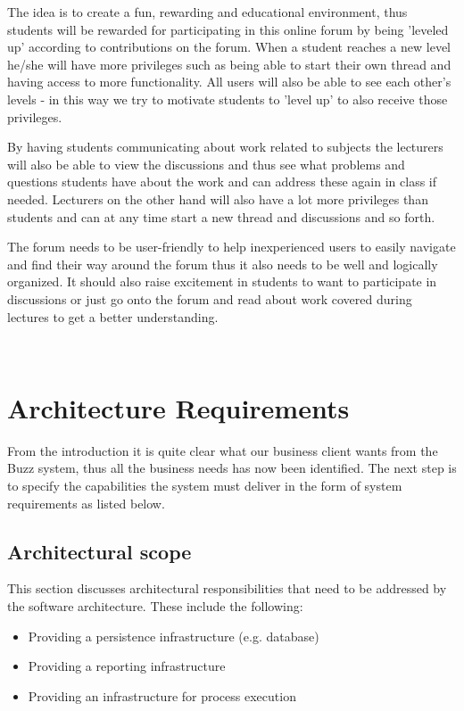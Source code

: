 \documentclass[a4paper]{article}
\begin{document}
The idea is to create a fun, rewarding and educational environment, thus students will be rewarded for participating in this online forum by being 'leveled up' according to contributions on the forum. When a student reaches a new level he/she will have more privileges such as being able to start their own thread and having access to more functionality. All users will also be able to see each other's levels - in this way we try to motivate students to 'level up' to also receive those privileges. 

By having students communicating about work related to subjects the lecturers will also be able to view the discussions and thus see what problems and questions students have about the work and can address these again in class if needed. Lecturers on the other hand will also have a lot more privileges than students and can at any time start a new thread and discussions and so forth. 

The forum needs to be user-friendly to help inexperienced users to easily navigate and find their way around the forum thus it also needs to be well and logically organized. It should also raise excitement in students to want to participate in discussions or just go onto the forum and read about work covered during lectures to get a better understanding. 

\\


\section{Architecture Requirements}

From the introduction it is quite clear what our business client wants from the Buzz system, thus all the business needs has now been identified. The next step is to specify the capabilities the system must deliver in the form of system requirements as listed  below. 

\subsection{Architectural scope}
This section discusses architectural responsibilities that need to be addressed by the software
architecture. These include the following:

\begin{itemize}
\item Providing a persistence infrastructure (e.g. database)
\item Providing a reporting infrastructure
\item Providing an infrastructure for process execution
\end{itemize}
\end{document}
